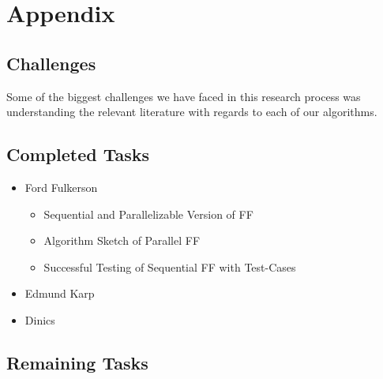 \section{Appendix}

\subsection{Challenges}
    Some of the biggest challenges we have faced in this research process was understanding the relevant literature with regards to each of our algorithms.

\subsection{Completed Tasks}
    \begin{itemize}
        \item Ford Fulkerson
            \begin{itemize}
                \item Sequential and Parallelizable Version of FF
                \item Algorithm Sketch of Parallel FF
                \item Successful Testing of Sequential FF with Test-Cases
            \end{itemize}
        \item Edmund Karp
        \item Dinics
    \end{itemize}
\subsection{Remaining Tasks}